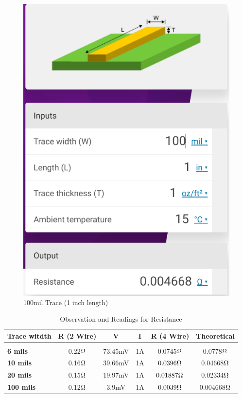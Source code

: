 \documentclass[a4paper,11pt]{article}%
\begin{document}
\begin{figure}[H]
\begin{minipage}[b]{0.45\linewidth}
	\includegraphics[scale=0.4]{figures/100}
	\caption{100mil Trace (1 inch length) }
\end{minipage}
\end{figure}


\begin{table}[H]
	\centering 
	\begin{tabular}{| l | c | c c c | c |}
		\hline
		\textbf{Trace witdth}&\textbf{R (2 Wire)}&\textbf{V}&\textbf{I}&\textbf{R (4 Wire)}&\textbf{Theoretical}\\\hline
		&&&&&\\
\textbf{6 mils}&0.22$\ohm$&73.45mV&1A&0.0745$\ohm$&0.0778$\ohm$\\
\textbf{10 mils}&0.16$\ohm$&39.66mV&1A&$0.0396\ohm$&0.04668$\ohm$\\
\textbf{20 mils}&0.15$\ohm$&19.97mV&1A&$0.01887\ohm$&0.02334$\ohm$\\
\textbf{100 mils}&0.12$\ohm$&3.9mV&1A&$0.0039\ohm$&0.004668$\ohm$\\


\hline\hline
	\end{tabular}
	\caption{Observation and Readings for Resistance}
\end{table}
\end{document}
